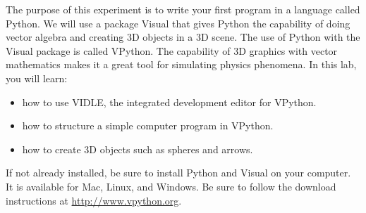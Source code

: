 
\apparatus
{}

\longgoal

The purpose of this experiment is to write your first program in a language called Python. We will use a package Visual that gives Python the capability of doing vector algebra and creating 3D objects in a 3D scene. The use of Python with the Visual package is called VPython. The capability of 3D graphics with vector mathematics makes it a great tool for simulating physics phenomena. In this lab, you will learn:

\begin{itemize}
	\item how to use VIDLE, the integrated development editor for VPython.
	\item how to structure a simple computer program in VPython.
	\item how to create 3D objects such as spheres and arrows.
\end{itemize}

\setup

If not already installed, be sure to install Python and Visual on your computer. It is available for Mac, Linux, and Windows. Be sure to follow the download instructions at \href{http://www.vpython.org}{http://www.vpython.org}.

\procedure

